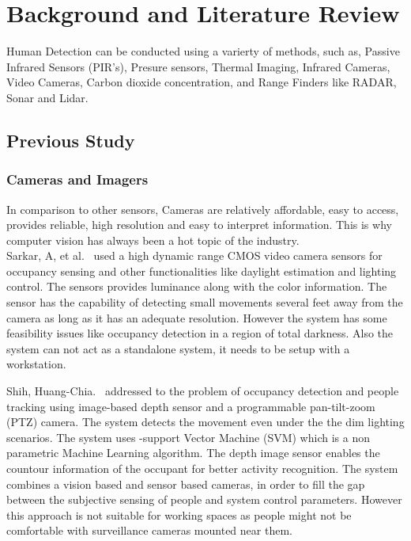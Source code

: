 \chapter{Background and Literature Review}
\label{chapter:background} 

Human Detection can be conducted using a varierty of methods, such as, Passive Infrared Sensors (PIR's), Presure sensors, Thermal Imaging, Infrared Cameras, Video Cameras, Carbon dioxide concentration, and Range Finders like RADAR, Sonar and Lidar.

\section{Previous Study}
\subsection{Cameras and Imagers}
In comparison to other sensors, Cameras are relatively affordable, easy to access, provides reliable, high resolution and easy to interpret information. This is why computer vision has always been a hot topic of the industry.
\\

Sarkar, A, et al.~\cite{sarkar2008integrated} used a high dynamic range CMOS video camera sensors for occupancy sensing and other functionalities like daylight estimation and lighting control. The sensors provides luminance along with the color information. The sensor has the capability of detecting small movements several feet away from the camera as long as it has an adequate resolution. However the system has some feasibility issues like occupancy detection in a region of total darkness. Also the system can not act as a standalone system, it needs to be setup with a workstation.

Shih, Huang-Chia.~\cite{shih2014robust} addressed to the problem of occupancy detection and people  tracking using image-based depth sensor and a programmable pan-tilt-zoom (PTZ) camera.
The system detects the movement even under the the dim lighting scenarios. The system uses -support Vector Machine (SVM) which is a non parametric Machine Learning algorithm. The depth image sensor enables the countour information of the occupant for better activity recognition. The system combines a vision based and sensor based cameras, in order to fill the gap between the subjective sensing of people and system control parameters. 
However this approach is not suitable for working spaces as people might not be comfortable with surveillance cameras mounted near them.
\\

